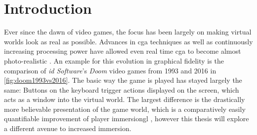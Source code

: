 
\chapter{Introduction}\label{chapter:Introduction}

Ever since the dawn of video games, the focus has been largely on making virtual worlds look as real as possible. Advances in \gls{cga} techniques as well as continuously increasing processing power have allowed even real time \gls{cga} to become almost photo-realistic \autocite{photorealismRealtime}.
\newline
An example for this evolution in graphical fidelity is the comparison of \textit{id Software}'s \textit{Doom} video games from 1993 and 2016 in \autoref{fig:doom1993vs2016}. The basic way the game is played has stayed largely the same: Buttons on the keyboard trigger actions displayed on the screen, which acts as a window into the virtual world. The largest difference is the drastically more believable presentation of the game world, which is a comparatively easily quantifiable improvement of player \gls{immersiongl} \autocite{gameImmersion}, however this thesis will explore a different avenue to increased immersion.


